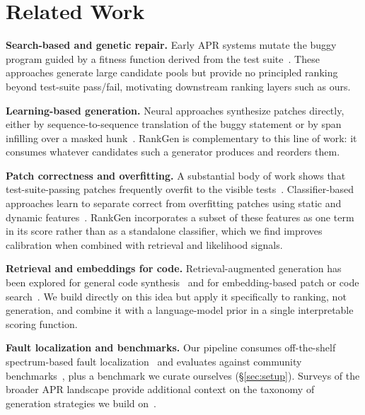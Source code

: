 \section{Related Work}
\label{sec:related}
\textbf{Search-based and genetic repair.} Early APR systems mutate the buggy program guided by a fitness function derived from the test suite~\cite{blackwood2017genprog,okafor2023searchapr}. These approaches generate large candidate pools but provide no principled ranking beyond test-suite pass/fail, motivating downstream ranking layers such as ours.

\textbf{Learning-based generation.} Neural approaches synthesize patches directly, either by sequence-to-sequence translation of the buggy statement or by span infilling over a masked hunk~\cite{marchetti2022neuralrepair,delgado2022llmcode}. RankGen is complementary to this line of work: it consumes whatever candidates such a generator produces and reorders them.

\textbf{Patch correctness and overfitting.} A substantial body of work shows that test-suite-passing patches frequently overfit to the visible tests~\cite{oyelaran2020overfitting}. Classifier-based approaches learn to separate correct from overfitting patches using static and dynamic features~\cite{alvarez2019classifier}. RankGen incorporates a subset of these features as one term in its score rather than as a standalone classifier, which we find improves calibration when combined with retrieval and likelihood signals.

\textbf{Retrieval and embeddings for code.} Retrieval-augmented generation has been explored for general code synthesis~\cite{nakamura2020rag} and for embedding-based patch or code search~\cite{park2019embeddings}. We build directly on this idea but apply it specifically to ranking, not generation, and combine it with a language-model prior in a single interpretable scoring function.

\textbf{Fault localization and benchmarks.} Our pipeline consumes off-the-shelf spectrum-based fault localization~\cite{tanaka2021faultloc} and evaluates against community benchmarks~\cite{feldman2018quirkbugs,singh2023faultline}, plus a benchmark we curate ourselves (\S\ref{sec:setup}). Surveys of the broader APR landscape provide additional context on the taxonomy of generation strategies we build on~\cite{osei2021survey}.
